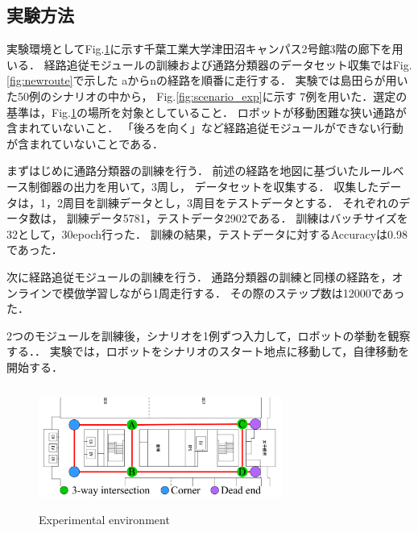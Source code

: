 \documentclass{sice-si}
\begin{document}
\subsection{実験方法}
実験環境としてFig.\ref{fig:cit3f}に示す千葉工業大学津田沼キャンパス2号館3階の廊下を用いる．
経路追従モジュールの訓練および通路分類器のデータセット収集ではFig.\ref{fig:newroute}で示した
aからnの経路を順番に走行する．
実験では島田らが用いた50例のシナリオの中から，
Fig.\ref{fig:scenario_exp}に示す
7例を用いた．選定の基準は，Fig.\ref{fig:cit3f}の場所を対象としていること．
ロボットが移動困難な狭い通路が含まれていないこと．
「後ろを向く」など経路追従モジュールができない行動が含まれていないことである．
\par
まずはじめに通路分類器の訓練を行う．
前述の経路を地図に基づいたルールベース制御器の出力を用いて，3周し，
データセットを収集する．
収集したデータは，1，2周目を訓練データとし，3周目をテストデータとする．
それぞれのデータ数は，
訓練データ5781，テストデータ2902である．
訓練はバッチサイズを32として，30epoch行った．
訓練の結果，テストデータに対するAccuracyは0.98であった．\par
次に経路追従モジュールの訓練を行う．
通路分類器の訓練と同様の経路を，オンラインで模倣学習しながら1周走行する．
その際のステップ数は12000であった．
\par
2つのモジュールを訓練後，シナリオを1例ずつ入力して，ロボットの挙動を観察する．．
実験では，ロボットをシナリオのスタート地点に移動して，自律移動を開始する．
\begin{figure}[htbp]
    \centering
     \includegraphics[height=40mm,width=80mm]{./figs/cit3f.pdf}
     \caption{Experimental environment}\label{fig:cit3f}
\end{figure}
\end{document}
